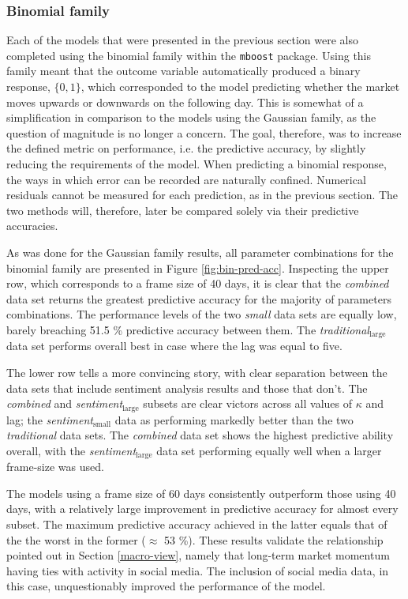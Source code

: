 \documentclass{article}
\begin{document}
\subsubsection{Binomial family  \label{results-bin}}
\label{sec-6-4-3}

Each of the models that were presented in the previous section were also completed using the binomial family within the \texttt{mboost} package. Using this family meant that the outcome variable automatically produced a binary response, $\{0, 1\}$, which corresponded to the model predicting whether the market moves upwards or downwards on the following day. This is somewhat of a simplification in comparison to the models using the Gaussian family, as the question of magnitude is no longer a concern. The goal, therefore, was to increase the defined metric on performance, i.e. the predictive accuracy, by slightly reducing the requirements of the model. When predicting a binomial response, the ways in which error can be recorded are naturally confined. Numerical residuals cannot be measured for each prediction, as in the previous section. The two methods will, therefore, later be compared solely via their predictive accuracies.

As was done for the Gaussian family results, all parameter combinations for the binomial family are presented in Figure \ref{fig:bin-pred-acc}. Inspecting the upper row, which corresponds to a frame size of 40 days, it is clear that the \emph{combined} data set returns the greatest predictive accuracy for the majority of parameters combinations. The performance levels of the two \emph{small} data sets are equally low, barely breaching 51.5 \% predictive accuracy between them. The \emph{traditional$_{\text{large}}$} data set performs overall best in case where the lag was equal to five.

The lower row tells a more convincing story, with clear separation between the data sets that include sentiment analysis results and those that don't. The \emph{combined} and \emph{sentiment$_{\text{large}}$} subsets are clear victors across all values of $\kappa$ and lag; the \emph{sentiment$_{\text{small}}$} data  as performing markedly better than the two \emph{traditional} data sets. The \emph{combined} data set shows the highest predictive ability overall, with the \emph{sentiment$_{\text{large}}$} data set performing equally well when a larger frame-size was used. 

The models using a frame size of 60 days consistently outperform those using 40 days, with a relatively large improvement in predictive accuracy for almost every subset. The maximum predictive accuracy achieved in the latter equals that of the the worst in the former ($\approx$ 53 \%). These results validate the relationship pointed out in Section \ref{macro-view}, namely that long-term market momentum having ties with activity in social media. The inclusion of social media data, in this case, unquestionably improved the performance of the model.
\end{document}
